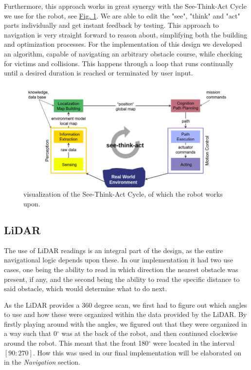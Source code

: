 \documentclass[conference]{IEEEtran}
\begin{document}
Furthermore, this approach works in great synergy with the See-Think-Act Cycle we use for the robot, see \href{sec:STAC}{Fig. 1}.
We are able to edit the "see", "think" and "act" parts individually and get instant feedback by testing. 
This approach to navigation is very straight forward to reason about, simplifying both the building and optimization processes.
For the implementation of this design we developed an algorithm, capable of navigating an arbitrary obstacle course, while checking for victims and collisions.
This happens through a loop that runs continually until a desired duration is reached or terminated by user input. 
\begin{figure}[h]
    \centerline{\includegraphics[width=1.0\columnwidth]{Pictures/STAC.png}}
    \caption{visualization of the See-Think-Act Cycle, of which the robot works upon.}
    \label{sec:STAC}
    \end{figure}

\subsection{LiDAR}
The use of LiDAR readings is an integral part of the design, as the entire navigational logic depends upon these.
In our implementation it had two use cases, one being the ability to read in which direction the nearest obstacle was present, if any, and the second being the ability to read the specific distance to said obstacle, which would determine what to do next.

As the LiDAR provides a 360 degree scan, we first had to figure out which angles to use and how these were organized within the data provided by the LiDAR.
By firstly playing around with the angles, we figured out that they were organized in a way such that 0$^\circ$ was at the back of the robot, and then continued clockwise around the robot.
This meant that the front 180$^\circ$ were located in the interval $[90:270]$. How this was used in our final implementation will be elaborated on in the \textit{Navigation} section.
\end{document}
